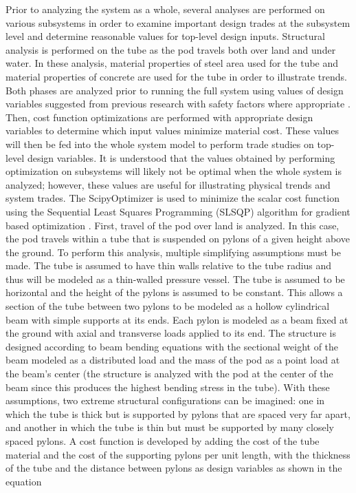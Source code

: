 Prior to analyzing the system as a whole, several analyses are performed on various subsystems in order to examine important design trades at the subsystem level and determine reasonable values for top-level design inputs. Structural analysis is performed on the tube as the pod travels both over land and under water. In these analysis, material properties of steel area used for the tube and material properties of concrete are used for the tube in order to illustrate trends. Both phases are analyzed prior to running the full system using values of design variables suggested from previous research with safety factors where appropriate \cite{Chin}. Then, cost function optimizations are performed with appropriate design variables to determine which input values minimize material cost. These values will then be fed into the whole system model to perform trade studies on top-level design variables. It is understood that the values obtained by performing optimization on subsystems will likely not be optimal when the whole system is analyzed; however, these values are useful for illustrating physical trends and system trades. The ScipyOptimizer is used to minimize the scalar cost function using the Sequential Least Squares Programming (SLSQP) algorithm for gradient based optimization \cite{GrayBenchmarking2013,Scipy}.
First, travel of the pod over land is analyzed. In this case, the pod travels within a tube that is suspended on pylons of a given height above the ground. To perform this analysis, multiple simplifying assumptions must be made. The tube is assumed to have thin walls relative to the tube radius and thus will be modeled as a thin-walled pressure vessel. The tube is assumed to be horizontal and the height of the pylons is assumed to be constant. This allows a section of the tube between two pylons to be modeled as a hollow cylindrical beam with simple supports at its ends. Each pylon is modeled as a beam fixed at the ground with axial and transverse loads applied to its end. The structure is designed according to beam bending equations with the sectional weight of the beam modeled as a distributed load and the mass of the pod as a point load at the beam’s center (the structure is analyzed with the pod at the center of the beam since this produces the highest bending stress in the tube).  With these assumptions, two extreme structural configurations can be imagined: one in which the tube is thick but is supported by pylons that are spaced very far apart, and another in which the tube is thin but must be supported by many closely spaced pylons. A cost function is developed by adding the cost of the tube material and the cost of the supporting pylons per unit length, with the thickness of the tube and the distance between pylons as design variables as shown in the equation

